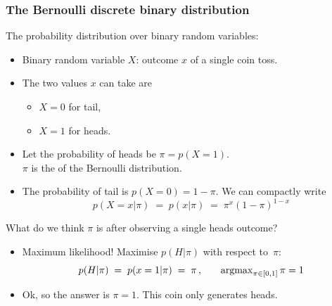 \begin{frame}
\frametitle{The Bernoulli discrete binary distribution}

The  probability distribution over binary random variables:
\begin{itemize}
\item Binary random variable $X$: outcome $x$ of a single coin toss.
\item The two values $x$ can take are
\begin{itemize} 
\item $X=0$ for tail,
\item $X=1$ for heads.
\end{itemize}
\item Let the probability of heads be $\pi=p(X=1)$.\\
$\pi$ is the  of the Bernoulli distribution.
\item The probability of tail is $p(X=0)=1-\pi$. We can compactly write
  \begin{equation*}
    p(X=x|\pi)\;=\;p(x|\pi)\;=\;\pi^x (1-\pi)^{1-x}
  \end{equation*}
\end{itemize}

What do we think $\pi$ is after observing a single heads outcome?
\begin{itemize}
\item Maximum likelihood! Maximise $p(H|\pi)$ with respect to\ $\pi$:
\[
p(H|\pi)\;=\;p(x=1|\pi)\;=\;\pi\,,
{\; \; \; \; \; \; }
\operatorname{argmax}_{\pi\in[0,1]} \pi = 1
\]
\item Ok, so the answer is $\pi=1$. This coin only generates heads.\\
\hfill{}\\
\end{itemize}

\end{frame}


